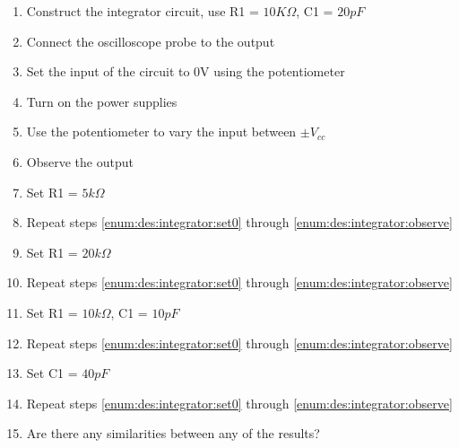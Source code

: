 \begin{enumerate}
\item Construct the integrator circuit, use R1 = $10K\Omega$, C1 = $20pF$
\item Connect the oscilloscope probe to the output
\item \label{enum:des:integrator:set0} Set the input of the circuit to 0V using the potentiometer
\item Turn on the power supplies
\item Use the potentiometer to vary the input between $\pm V_{cc}$
\item \label{enum:des:integrator:observe} Observe the output
\item Set R1 = $5k\Omega$
\item Repeat steps \ref{enum:des:integrator:set0} through \ref{enum:des:integrator:observe}
\item Set R1 = $20k\Omega$
\item Repeat steps \ref{enum:des:integrator:set0} through \ref{enum:des:integrator:observe}
\item Set R1 = $10k\Omega$, C1 = $10pF$
\item Repeat steps \ref{enum:des:integrator:set0} through \ref{enum:des:integrator:observe}
\item Set C1 = $40pF$
\item Repeat steps \ref{enum:des:integrator:set0} through \ref{enum:des:integrator:observe}
\item Are there any similarities between any of the results?
\end{enumerate}
